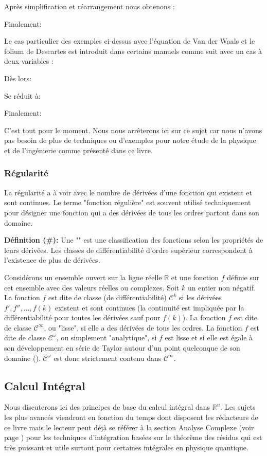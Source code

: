 	Après simplification et réarrangement nous obtenons :
	
	Finalement:
	
	Le cas particulier des exemples ci-dessus avec l'équation de Van der Waals et le folium de Descartes est introduit dans certains manuels comme suit avec un cas à deux variables :
	
	Dès lors:
	
	Se réduit à:
	
	Finalement:
	
	C'est tout pour le moment. Nous nous arrêterons ici sur ce sujet car nous n'avons pas besoin de plus de techniques ou d'exemples pour notre étude de la physique et de l'ingénierie comme présenté dans ce livre.
	
		\pagebreak
		\subsubsection{Régularité}\label{smoothness}
		La régularité a à voir avec le nombre de dérivées d'une fonction qui existent et sont continues. Le terme "fonction régulière" est souvent utilisé techniquement pour désigner une fonction qui a des dérivées de tous les ordres partout dans son domaine.
		 
		 \textbf{Définition (\#\mydef):} Une "" est une classification des fonctions selon les propriétés de leurs dérivées. Les classes de différentiabilité d'ordre supérieur correspondent à l'existence de plus de dérivées.
		 
		 Considérons un ensemble ouvert sur la ligne réelle $\mathbb{R}$ et une fonction $f$ définie sur cet ensemble avec des valeurs réelles ou complexes. Soit $k$ un entier non négatif. La fonction $f$ est dite de classe (de différentiabilité) $\mathcal{C}^k$ si les dérivées $f', f'', ..., f(k)$ existent et sont continues (la continuité est impliquée par la différentiabilité pour toutes les dérivées sauf pour $f(k)$). La fonction $f$ est dite de classe $\mathcal{C}^\infty$, ou "lisse", si elle a des dérivées de tous les ordres. La fonction $f$ est dite de classe $\mathcal{C}^\omega$, ou simplement "analytique", si $f$ est lisse et si elle est égale à son développement en série de Taylor autour d'un point quelconque de son domaine (). $\mathcal{C}^\omega$ est donc strictement contenu dans $\mathcal{C}^\infty$.

		\pagebreak
		 \subsection{Calcul Intégral}\label{integral calculus}
		 Nous discuterons ici des principes de base du calcul intégral dans $\mathbb{R}^n$. Les sujets les plus avancés viendront en fonction du temps dont disposent les rédacteurs de ce livre mais le lecteur peut déjà se référer à la section Analyse Complexe (voir page \pageref{complex analysis}) pour les techniques d'intégration basées sur le théorème des résidus qui est très puissant et utile surtout pour certaines intégrales en physique quantique.
		 
